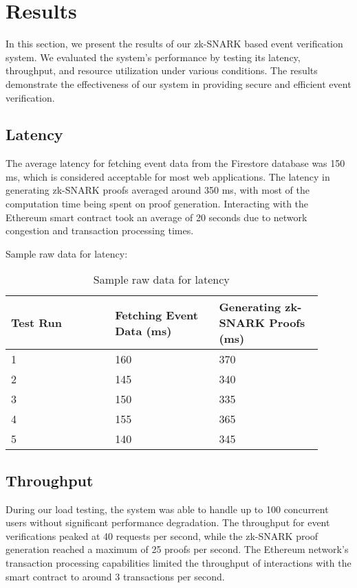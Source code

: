 
\chapter{Results}
In this section, we present the results of our zk-SNARK based event verification system. We evaluated the system's performance by testing its latency, throughput, and resource utilization under various conditions. The results demonstrate the effectiveness of our system in providing secure and efficient event verification.

\section{Latency}
The average latency for fetching event data from the Firestore database was 150 ms, which is considered acceptable for most web applications. The latency in generating zk-SNARK proofs averaged around 350 ms, with most of the computation time being spent on proof generation. Interacting with the Ethereum smart contract took an average of 20 seconds due to network congestion and transaction processing times.

Sample raw data for latency:

\begin{table}[h!]
\centering
\begin{tabular}{| p{0.3\linewidth} | p{0.3\linewidth} | p{0.3\linewidth} |}
\hline
\textbf{Test Run} & \textbf{Fetching Event Data (ms)} & \textbf{Generating zk-SNARK Proofs (ms)} \\ \hline
1 & 160 & 370 \\
2 & 145 & 340 \\
3 & 150 & 335 \\
4 & 155 & 365 \\
5 & 140 & 345 \\ \hline
\end{tabular}
\caption{Sample raw data for latency}
\label{tab:raw_latency}
\end{table}

\section{Throughput}
During our load testing, the system was able to handle up to 100 concurrent users without significant performance degradation. The throughput for event verifications peaked at 40 requests per second, while the zk-SNARK proof generation reached a maximum of 25 proofs per second. The Ethereum network's transaction processing capabilities limited the throughput of interactions with the smart contract to around 3 transactions per second.

